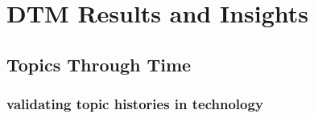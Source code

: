 
\chapter{DTM Results and Insights} %

\label{Chapter4} %



\section{Topics Through Time}



\subsection{validating topic histories in technology}



